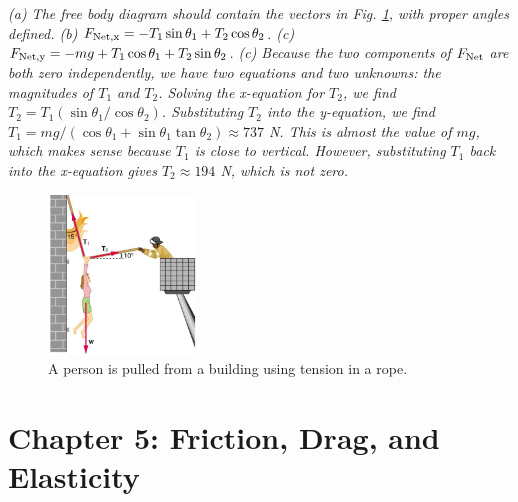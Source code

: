 \documentclass[10pt]{article}
\begin{document}
\begin{enumerate}
\textit{(a) The free body diagram should contain the vectors in Fig. \ref{fig:fire}, with proper angles defined.  (b) $F_{\rm Net,x} = -T_1 \sin\theta_1 + T_2 \cos\theta_2$. (c) $F_{\rm Net,y} = -mg + T_1 \cos\theta_1 + T_2 \sin\theta_2$.  (c) Because the two components of $F_{\rm Net}$ are both zero independently, we have two equations and two unknowns: the magnitudes of $T_1$ and $T_2$.  Solving the x-equation for $T_2$, we find $T_2 = T_1 (\sin\theta_1/\cos\theta_2)$.  Substituting $T_2$ into the y-equation, we find $T_1 = mg/(\cos\theta_1 + \sin\theta_1\tan\theta_2) \approx 737$ N.  This is almost the value of $mg$, which makes sense because $T_1$ is close to vertical.  However, substituting $T_1$ back into the x-equation gives $T_2 \approx 194$ N, which is not zero.}
\begin{figure}[hb]
\centering
\includegraphics[width=0.35\textwidth]{fire.png}
\caption{\label{fig:fire} A person is pulled from a building using tension in a rope.}
\end{figure}
\end{enumerate}

\clearpage

\section{Chapter 5: Friction, Drag, and Elasticity}
\end{document}
